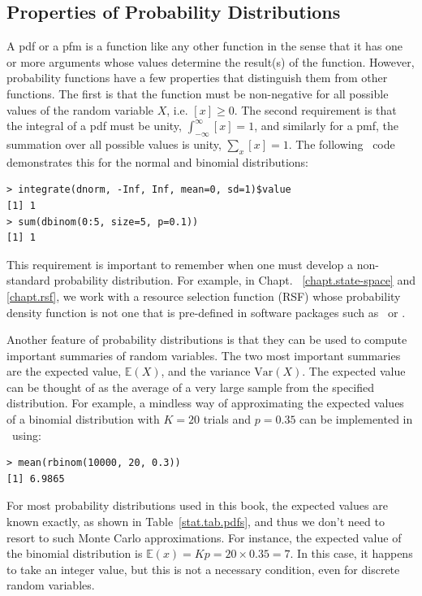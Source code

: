 \subsection{Properties of Probability Distributions}

A pdf or a pfm is a function like any other function
in the sense that it has one or more arguments whose values determine
the result(s) of the function. However, probability functions have a few
properties that distinguish them from other functions.
The first is that the function
must be non-negative for all possible values of the random variable
$X$, i.e. $[x] \geq 0$. The second requirement is that the integral of
a pdf must be unity, $\int_{-\infty}^{\infty} [x] = 1$, and similarly
for a pmf, the summation over all possible values is unity, $\sum_x [x]
= 1$. The following \R~code demonstrates
this for the normal and binomial distributions:
\begin{verbatim}
> integrate(dnorm, -Inf, Inf, mean=0, sd=1)$value
[1] 1
> sum(dbinom(0:5, size=5, p=0.1))
[1] 1
\end{verbatim}
This requirement is important to remember when one must develop a
non-standard probability distribution. For example, in Chapt.
~\ref{chapt.state-space} and \ref{chapt.rsf},
we work with a resource selection function (RSF) whose probability
density function is not one that is pre-defined in software packages
such as \R~or \bugs.

Another feature of probability distributions is that they can be used
to compute important summaries of random variables. The two most
important summaries are the expected value, $\mathbb{E}(X)$,
and the variance $\text{Var}(X)$. The expected value
can be thought of as the average
of a very large sample from the specified distribution. For
example, a mindless way of approximating the expected values of a binomial
distribution with $K=20$ trials and $p=0.35$ can be implemented in \R~using:
\begin{verbatim}
> mean(rbinom(10000, 20, 0.3))
[1] 6.9865
\end{verbatim}
For most probability distributions used in this book, the expected
values are known exactly, as shown in Table~\ref{stat.tab.pdfs}, and
thus we don't need to resort to such Monte Carlo approximations. For instance, the
expected value of the binomial distribution is $\mathbb{E}(x) = Kp =
20 \times 0.35 = 7$. In this case, it happens to take an integer
value, but this is not a necessary condition, even for discrete random
variables.

